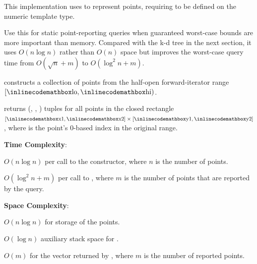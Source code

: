 This implementation uses  to represent points, requiring  to be defined on the numeric template type.

Use this for static point-reporting queries when guaranteed worst-case bounds are more important than memory. Compared with the k-d tree in the next section, it uses $O(n \log n)$ rather than $O(n)$ space but improves the worst-case query time from $O(\sqrt{n} + m)$ to $O(\log^{2} n + m)$.

\begin{compactitem}
  \item {} constructs a collection of  points from the half-open forward-iterator range $[{\inlinecodemath{lo}}, {\inlinecodemath{hi}})$.
  \item {} returns (, , ) tuples for all points in the closed rectangle $[{\inlinecodemath{x1}}, {\inlinecodemath{x2}}] \times [{\inlinecodemath{y1}}, {\inlinecodemath{y2}}]$, where  is the point's 0-based index in the original range.
\end{compactitem}

\textbf{Time Complexity}:
\begin{compactitem}
  \item $O(n \log n)$ per call to the constructor, where $n$ is the number of points.
  \item $O(\log^{2} n + m)$ per call to , where $m$ is the number of points that are reported by the query.
\end{compactitem}

\textbf{Space Complexity}:
\begin{compactitem}
  \item $O(n \log n)$ for storage of the points.
  \item $O(\log n)$ auxiliary stack space for .
  \item $O(m)$ for the vector returned by , where $m$ is the number of reported points.
\end{compactitem}

